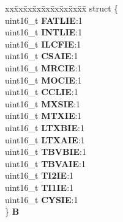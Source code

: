 \begin{DoxyCompactItemize}
\begin{tabbing}
\end{tabbing}\item 
\mbox{\label{unionuPIER0_a483278852a5322490b8a5fe18ce9c867}} 
\begin{tabbing}
xx\=xx\=xx\=xx\=xx\=xx\=xx\=xx\=xx\=\kill
struct \{\\
\>uint16\_t {\bfseries FATLIE}:1\\
\>uint16\_t {\bfseries INTLIE}:1\\
\>uint16\_t {\bfseries ILCFIE}:1\\
\>uint16\_t {\bfseries CSAIE}:1\\
\>uint16\_t {\bfseries MRCIE}:1\\
\>uint16\_t {\bfseries MOCIE}:1\\
\>uint16\_t {\bfseries CCLIE}:1\\
\>uint16\_t {\bfseries MXSIE}:1\\
\>uint16\_t {\bfseries MTXIE}:1\\
\>uint16\_t {\bfseries LTXBIE}:1\\
\>uint16\_t {\bfseries LTXAIE}:1\\
\>uint16\_t {\bfseries TBVBIE}:1\\
\>uint16\_t {\bfseries TBVAIE}:1\\
\>uint16\_t {\bfseries TI2IE}:1\\
\>uint16\_t {\bfseries TI1IE}:1\\
\>uint16\_t {\bfseries CYSIE}:1\\
\} {\bfseries B}\\


\end{tabbing}
\end{DoxyCompactItemize}
